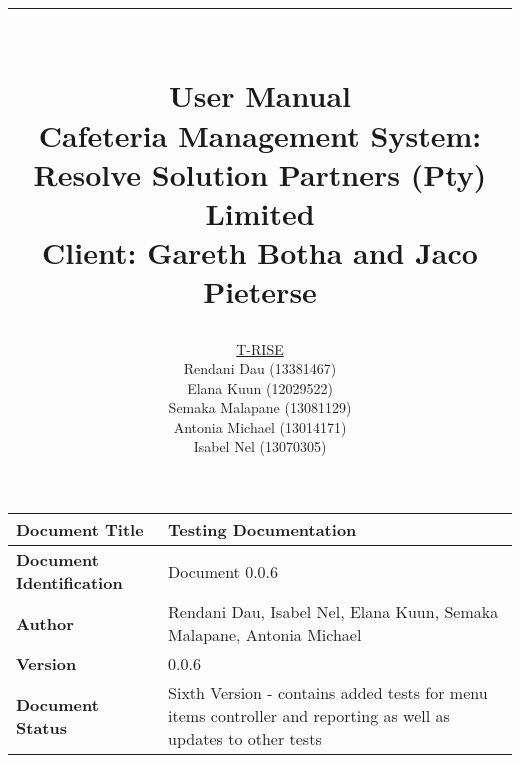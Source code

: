 \documentclass[a4paper,12pt]{article}
\title{ \rule{\textwidth}{1pt}  \\ \Huge User Manual \\ 
	\Large Cafeteria Management System: Resolve Solution Partners (Pty) Limited \\
	\small Client: Gareth Botha and Jaco Pieterse}
\author{
         \underline{T-RISE}\\
          Rendani Dau (13381467) \\
	Elana Kuun (12029522) \\
	Semaka Malapane (13081129) \\
	Antonia Michael (13014171) \\
	Isabel Nel (13070305)}
\date{\today \\ \rule{\textwidth}{1pt}}
\begin{document}
\maketitle
\break

\tableofcontents
\break


 \begin{tabu} to 0.8\textwidth { | X[l] | X[l] | }
 \hline
 \textbf{Document Title} & Testing Documentation \\
 \hline
 \textbf{Document Identification}  & Document 0.0.6 \\
 \hline
 \textbf{Author}  & Rendani Dau, Isabel Nel, Elana Kuun, Semaka Malapane, Antonia Michael \\
 \hline
 \textbf{Version} & 0.0.6\\
 \hline
 \textbf{Document Status} & Sixth Version - contains added tests for menu items controller and reporting as well as updates to other tests  \\
 \hline
 \end{tabu}
\end{document}
